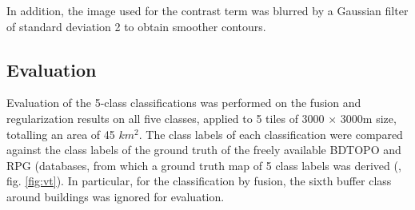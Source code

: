 \documentclass[10pt]{article}
\begin{document}
In addition, the image used for the contrast term was blurred by a Gaussian filter of standard deviation 2 to obtain smoother contours.

\subsection{Evaluation}

Evaluation of the 5-class classifications was performed on the fusion and regularization results on all five classes, applied to 5 tiles of 3000 $\times$ 3000m size, totalling an area of 45 $km^2$. The class labels of each classification were compared against the class labels of the ground truth of the freely available BDTOPO and RPG (databases, from which a ground truth map of 5 class labels was derived (\cite{bdtopo,RPG}, fig. \ref{fig:vt}). In particular, for the classification by fusion, the sixth buffer class around buildings was ignored for evaluation.\\
\end{document}
